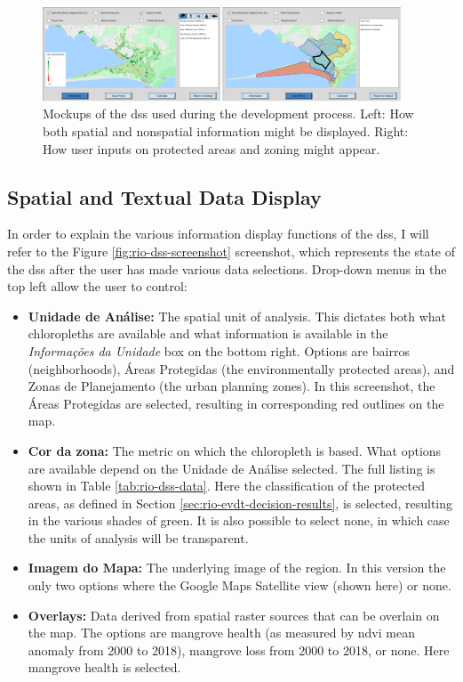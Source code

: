 \begin{figure}[!htb] 
\centering
\includegraphics[width=0.95\textwidth]{Figures/chap4/display_and_input.png}
\caption[Rio DSS Mockups]{Mockups of the \ac{dss} used during the development process. Left: How both spatial and nonspatial information might be displayed. Right: How user inputs on protected areas and zoning might appear.}
\label{fig:mockup}
\end{figure}

\subsection{Spatial and Textual Data Display}

In order to explain the various information display functions of the \ac{dss}, I will refer to the Figure \ref{fig:rio-dss-screenshot} screenshot, which represents the state of the \ac{dss} after the user has made various data selections. Drop-down menus in the top left allow the user to control:

\begin{itemize}[itemsep=0pt,parsep=0pt]
	\item{\textbf{Unidade de Análise:} The spatial unit of analysis. This dictates both what chloropleths are available and what information is available in the \textit{Informações da Unidade} box on the bottom right. Options are bairros (neighborhoods), Áreas Protegidas (the environmentally protected areas), and Zonas de Planejamento (the urban planning zones). In this screenshot, the Áreas Protegidas are selected, resulting in corresponding red outlines on the map.}
	\item{\textbf{Cor da zona:} The metric on which the chloropleth is based. What options are available depend on the Unidade de Análise selected. The full listing is shown in Table \ref{tab:rio-dss-data}. Here the classification of the protected areas, as defined in Section \ref{sec:rio-evdt-decision-results}, is selected, resulting in the various shades of green. It is also possible to select none, in which case the units of analysis will be transparent.}
	\item{\textbf{Imagem do Mapa:} The underlying image of the region. In this version the only two options where the Google Maps Satellite view (shown here) or none.}
	\item{\textbf{Overlays:} Data derived from spatial raster sources that can be overlain on the map. The options are mangrove health (as measured by \ac{ndvi} mean anomaly from 2000 to 2018), mangrove loss from 2000 to 2018, or none. Here mangrove health is selected.} 
\end{itemize}

